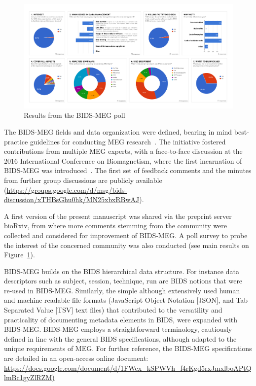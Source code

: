 \begin{figure}
\begin{center}
   \includegraphics[width=\linewidth]{figures/MEG-BIDS_poll_results_figure.pdf}
\end{center}
   \caption[BIDS-MEG data organization scheme.]{Results from the BIDS-MEG poll}
   \label{fig:BIDS-MEG-poll}
\end{figure}

The BIDS-MEG fields and data organization were defined, bearing in mind best-practice guidelines for conducting MEG research~\citep{gross2013good}. The initiative fostered contributions from multiple MEG experts, with a face-to-face discussion at the 2016 International Conference on Biomagnetism, where the first incarnation of BIDS-MEG was introduced~\citep{niso2016megbids}. The first set of feedback comments and the minutes from further group discussions are publicly available
(\url{https://groups.google.com/d/msg/bids-discussion/xTHBsGhu0hk/MN25xbxRBwAJ}).

A first version of the present manuscript was shared via the preprint server bioRxiv, from where more comments stemming from the community were collected and considered for improvement of BIDS-MEG. A poll survey to probe the interest of the concerned community was also conducted (see main results on Figure~\ref{fig:BIDS-MEG-poll}).

BIDS-MEG builds on the BIDS hierarchical data structure. For instance data descriptors such as subject, session, technique, run are BIDS notions that were re-used in BIDS-MEG. Similarly, the simple although extensively used human and machine readable file formats (JavaScript Object Notation [JSON], and Tab Separated Value [TSV] text files) that contributed to the versatility and practicality of documenting metadata elements in BIDS, were expanded with BIDS-MEG. BIDS-MEG employs a straightforward terminology, cautiously defined in line with the general BIDS specifications, although adapted to the unique requirements of MEG.  For further reference, the BIDS-MEG specifications are detailed in an open-access online document:
\url{https://docs.google.com/document/d/1FWex_kSPWVh_f4rKgd5rxJmxlboAPtQlmBc1gyZlRZM)}

